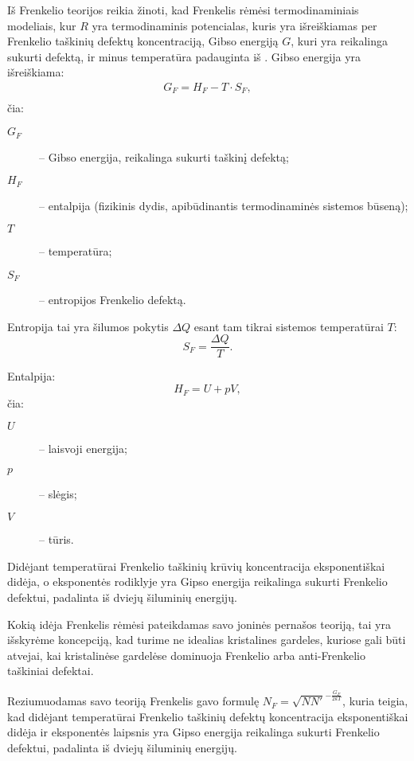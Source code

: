 Iš Frenkelio teorijos reikia žinoti, kad Frenkelis rėmėsi termodinaminiais
modeliais, kur $R$ yra termodinaminis potencialas, kuris yra išreiškiamas
per Frenkelio taškinių defektų koncentraciją, Gibso energiją $G$, kuri
yra reikalinga sukurti defektą, ir minus temperatūra padauginta iš
. Gibso energija yra išreiškiama:
\begin{align*}
  G_{F} = H_{F} - T \cdot S_{F}, \\
\end{align*}
čia:
\begin{description}
  \item[$G_{F}$] – Gibso energija, reikalinga sukurti taškinį defektą;
  \item[$H_{F}$] – entalpija (fizikinis dydis, apibūdinantis
    termodinaminės sistemos būseną);
  \item[$T$] – temperatūra;
  \item[$S_{F}$] – entropijos  Frenkelio defektą.
\end{description}

Entropija tai yra šilumos pokytis $\Delta Q$ esant tam tikrai
sistemos temperatūrai $T$:
\begin{equation*}
  S_{F} = \frac{\Delta Q}{T}.
\end{equation*}

Entalpija:
\begin{equation*}
  H_{F} = U + pV,
\end{equation*}
čia:
\begin{description}
  \item[$U$] – laisvoji energija;
  \item[$p$] – slėgis;
  \item[$V$] – tūris.
\end{description}

Didėjant temperatūrai Frenkelio taškinių krūvių koncentracija eksponentiškai
didėja, o eksponentės rodiklyje yra Gipso energija reikalinga sukurti
Frenkelio defektui, padalinta iš dviejų šiluminių energijų.

\begin{remember}
  \item Kokią idėja Frenkelis rėmėsi pateikdamas savo joninės pernašos
    teoriją, tai yra išskyrėme koncepciją, kad turime ne idealias
    kristalines gardeles, kuriose gali būti atvejai, kai kristalinėse
    gardelėse dominuoja Frenkelio arba anti-Frenkelio taškiniai defektai.
  \item Reziumuodamas savo teoriją Frenkelis gavo formulę
    $N_{F} = \sqrt{NN'}^{-\frac{G_F}{2kT}}$, kuria teigia, kad didėjant
    temperatūrai Frenkelio taškinių defektų koncentracija
    eksponentiškai didėja ir eksponentės laipsnis yra Gipso energija
    reikalinga sukurti Frenkelio defektui, padalinta iš dviejų
    šiluminių energijų.
\end{remember}

